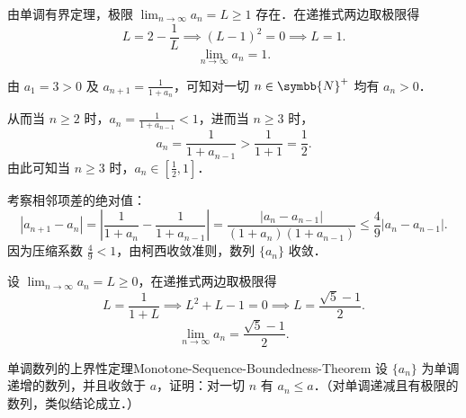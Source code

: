 \begin{solution}
    由单调有界定理，极限 $\lim_{n\to\infty} a_n = L \geqslant 1$ 存在．在递推式两边取极限得
    \begin{equation}
        L = 2 - \frac{1}{L} \implies (L - 1)^2 = 0 \implies L = 1.
    \end{equation}
    \begin{equation}
        \boxed{\lim_{n\to\infty} a_n = 1.}
    \end{equation}


    由 $a_1 = 3 > 0$ 及 $a_{n+1} = \frac{1}{1 + a_n}$，可知对一切 $n \in \symbb{N}^+$ 均有 $a_n > 0$．

    从而当 $n \geqslant 2$ 时，$a_n = \frac{1}{1 + a_{n-1}} < 1$，进而当 $n \geqslant 3$ 时，
    \begin{equation}
        a_n = \frac{1}{1 + a_{n-1}} > \frac{1}{1 + 1} = \frac{1}{2}.
    \end{equation}
    由此可知当 $n \geqslant 3$ 时，$a_n \in \left[ \frac{1}{2}, 1 \right]$．

    考察相邻项差的绝对值：
    \begin{equation}
        |a_{n+1} - a_n| = \left| \frac{1}{1 + a_n} - \frac{1}{1 + a_{n-1}} \right| = \frac{|a_n - a_{n-1}|}{(1 + a_n)(1 + a_{n-1})} \leqslant \frac{4}{9} |a_n - a_{n-1}|.
    \end{equation}
    因为压缩系数 $\frac{4}{9} < 1$，由柯西收敛准则，数列 $\{a_n\}$ 收敛．

    设 $\lim_{n\to\infty} a_n = L \geqslant 0$，在递推式两边取极限得
    \begin{equation}
        L = \frac{1}{1 + L} \implies L^2 + L - 1 = 0 \implies L = \frac{\sqrt{5} - 1}{2}.
    \end{equation}
    \begin{equation}
        \boxed{\lim_{n\to\infty} a_n = \frac{\sqrt{5} - 1}{2}.}
    \end{equation}
\end{solution}

\begin{problem}{单调数列的上界性定理}{Monotone-Sequence-Boundedness-Theorem}
    设 $\{a_n\}$ 为单调递增的数列，并且收敛于 $a$，证明：对一切 $n$ 有 $a_n \leqslant a$．（对单调递减且有极限的数列，类似结论成立．）
\end{problem}

